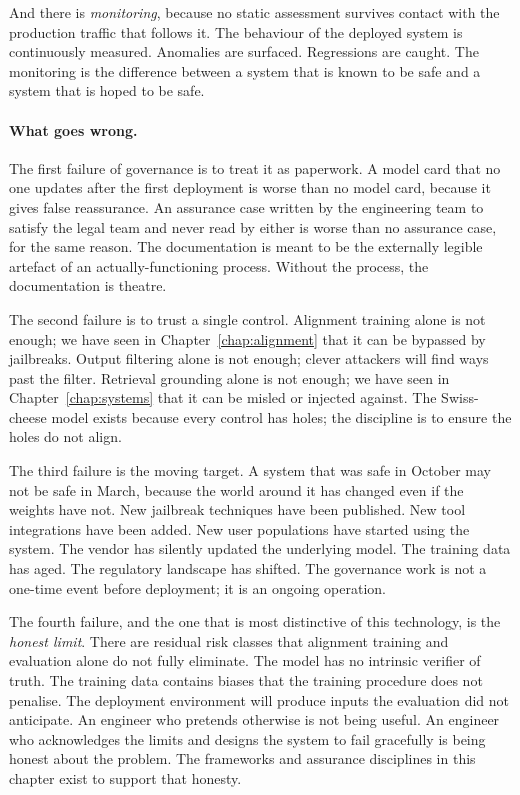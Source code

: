 And there is \emph{monitoring}, because no static assessment
survives contact with the production traffic that follows it.
The behaviour of the deployed system is continuously
measured. Anomalies are surfaced. Regressions are caught.
The monitoring is the difference between a system that is
known to be safe and a system that is hoped to be safe.

\paragraph{What goes wrong.} The first failure of governance is to treat it as paperwork.
A model card that no one updates after the first deployment
is worse than no model card, because it gives false
reassurance. An assurance case written by the engineering
team to satisfy the legal team and never read by either is
worse than no assurance case, for the same reason. The
documentation is meant to be the externally legible artefact
of an actually-functioning process. Without the process, the
documentation is theatre.

The second failure is to trust a single control. Alignment
training alone is not enough; we have seen in Chapter~\ref{chap:alignment} that
it can be bypassed by jailbreaks. Output filtering alone is
not enough; clever attackers will find ways past the filter.
Retrieval grounding alone is not enough; we have seen in
Chapter~\ref{chap:systems} that it can be misled or injected against. The
Swiss-cheese model exists because every control has holes;
the discipline is to ensure the holes do not align.

The third failure is the moving target. A system that was
safe in October may not be safe in March, because the world
around it has changed even if the weights have not. New
jailbreak techniques have been published. New tool
integrations have been added. New user populations have
started using the system. The vendor has silently updated the
underlying model. The training data has aged. The regulatory
landscape has shifted. The governance work is not a one-time
event before deployment; it is an ongoing operation.

The fourth failure, and the one that is most distinctive of
this technology, is the \emph{honest limit}. There are
residual risk classes that alignment training and evaluation
alone do not fully eliminate. The model has no intrinsic
verifier of truth. The training data contains biases that the
training procedure does not penalise. The deployment
environment will produce inputs the evaluation did not
anticipate. An engineer who pretends otherwise is not being
useful. An engineer who acknowledges the limits and designs
the system to fail gracefully is being honest about the
problem. The frameworks and assurance disciplines in this
chapter exist to support that honesty.

